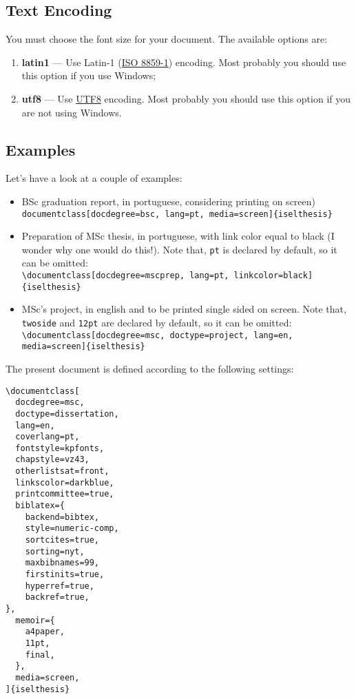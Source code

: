 \subsection{Text Encoding} %
\label{ssec:text_encoding}

You must choose the font size for your document. The available options are:
\begin{enumerate}
	\item \textbf{latin1} --- Use Latin-1 (\href{http://en.wikipedia.org/wiki/ISO/IEC_8859-1}{ISO 8859-1}) encoding.  Most probably you should use this option if you use Windows;
	\item \textbf{utf8} --- Use \href{http://en.wikipedia.org/wiki/UTF-8}{UTF8} encoding.    Most probably you should use this option if you are not using Windows.
\end{enumerate}

\subsection{Examples} %
\label{ssec:examples}

Let's have a look at a couple of examples:

\begin{itemize}
	\item BSc graduation report, in portuguese, considering printing on screen)\\
	\verb!documentclass[docdegree=bsc, lang=pt, media=screen]{iselthesis}!
	\item Preparation of MSc thesis, in portuguese, with link color equal to black (I wonder why one would do this!). Note that, \verb!pt! is declared by default, so it can be omitted: \\
	\verb!\documentclass[docdegree=mscprep, lang=pt, linkcolor=black]{iselthesis}!
	\item MSc's project, in english and to be printed single sided on screen. Note that, \verb!twoside! and \verb!12pt! are declared by default, so it can be omitted: \\
	\verb!\documentclass[docdegree=msc, doctype=project, lang=en, media=screen]{iselthesis}!
\end{itemize}


The present document is defined according to the following settings:
\begin{Verbatim}[breaklines=true, breakanywhere=true]
\documentclass[
  docdegree=msc,       
  doctype=dissertation, 
  lang=en,             
  coverlang=pt,        
  fontstyle=kpfonts,   
  chapstyle=vz43,    
  otherlistsat=front,   
  linkscolor=darkblue,  
  printcommittee=true, 
  biblatex={            
    backend=bibtex,		  
    style=numeric-comp, 
    sortcites=true,     
    sorting=nyt,       
    maxbibnames=99,			
    firstinits=true,   
    hyperref=true,
    backref=true,      
},
  memoir={	          
    a4paper,          
    11pt,              
    final,            
  },
  media=screen,         
]{iselthesis}
\end{Verbatim}

